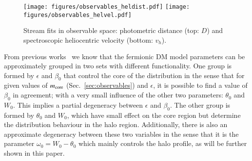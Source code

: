 \documentclass[twocolumn]{aa}
\begin{document}
\begin{figure*}
   \texttt{[image: figures/observables\_heldist.pdf]}
   \texttt{[image: figures/observables\_helvel.pdf]}
   \caption{Stream fits in observable space: photometric distance (top: $D$) and
   spectroscopic heliocentric velocity (bottom: $v_h$).}
   \label{fig:obs_radial}
\end{figure*}
From previous works~\citep{arguelles_novel_2018,2019PDU....24..278A,2023ApJ...945....1K} we know that the fermionic DM model parameters can be approximately grouped in two sets with different functionality. One group is formed
by $\epsilon$ and $\beta_0$ that control the core of the distribution in the sense that
for given values of $m_{\rm{core}}$ (Sec.~\ref{sec:observables}) and $\epsilon$, it is possible to find a value of $\beta_0$ in agreement; with a very small influence of the other two parameters: $\theta_0$ and $W_0$. This implies a partial degeneracy between $\epsilon$ and $\beta_0$.
The other group is formed by $\theta_0$ and $W_0$, which have small effect on the core region but
determine the distribution behaviour in the halo region. Additionally, there is also an approximate
degeneracy between these two variables in the sense that it is the parameter
$\omega_0 = W_0-\theta_0$ which mainly controls the halo profile, as will be further shown in this paper.
\end{document}

